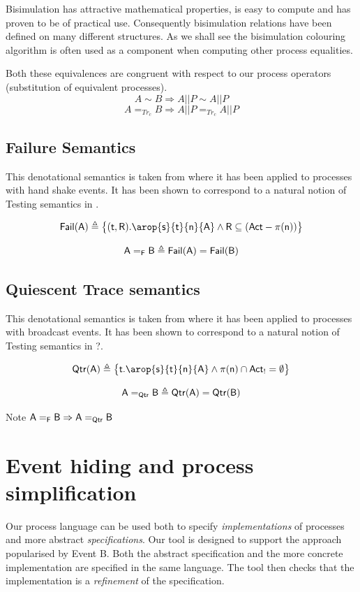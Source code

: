 \documentclass[]{article}
\begin{document}
 Bisimulation has  attractive mathematical properties, is easy to compute and has proven to be of practical use. Consequently bisimulation relations have been defined on many different structures. As we shall see the bisimulation colouring algorithm  is often used as a component when computing other process equalities.

Both these equivalences are congruent with respect to our process operators (substitution of equivalent processes).
\[ A\sim B \Rightarrow A||P\sim A||P\]
\[ A =_{Tr_{c}}  B  \Rightarrow  A||P =_{Tr_{c}}  A||P\]


\subsection{Failure Semantics}
This denotational semantics is taken from \cite{CSP} where it has been applied to processes with hand shake events. It has been shown to correspond to a natural notion of Testing semantics in \cite{}.

\[ \sf Fail(A) \triangleq \big\{(t,R) . \arop{s}{t}{n}{A} \land R \subseteq (Act -\pi(n)) \big\}\]

\[\sf A=_F B \triangleq Fail(A) = Fail(B)\]


\subsection{Quiescent Trace semantics}
This denotational semantics is taken from \cite{IOA} where it has been applied to processes with broadcast events. It has been shown to correspond to a natural notion of Testing semantics in {\sf ?}.

\[ \sf Qtr(A) \triangleq \big\{t . \arop{s}{t}{n}{A} \land \pi(n) \cap Act_{!} = \emptyset \big\}\]

\[\sf A=_{Qtr} B \triangleq Qtr(A) = Qtr(B)\]

Note $ \sf A=_F B \Rightarrow A=_{Qtr} B$

\section{Event hiding and process simplification}
Our process language can be used both to specify \emph{implementations}  of  processes and more abstract \emph{specifications}.  Our tool is designed to support the approach popularised by Event B. Both the abstract specification and the more concrete implementation are specified in the same language.  The tool then checks that the implementation is a \emph{refinement} of the specification.
\end{document}
